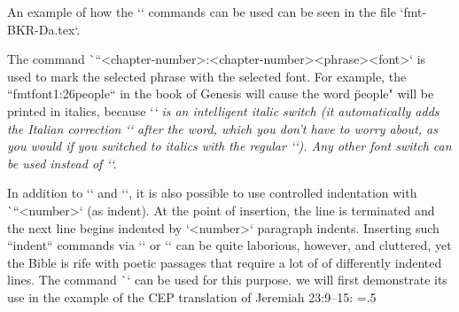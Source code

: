 An example of how the `\fmt*` commands can be used can be seen in the file
`fmt-BKR-Da.tex`.

The command \`\fmtfont``{<chapter-number>:<chapter-number>}{<phrase>}{<font>}`
is used to mark the selected phrase with the selected font.
For example, the ``fmtfont{1:26}{people}{\em}`` in the book of Genesis will cause the word
\"people" will be printed in italics, because `\em` is an intelligent italic switch (it automatically adds the Italian correction `\/` after the word, which you don't have to worry about, as you would if you switched to italics with the regular `\it`).
Any other font switch can be used instead of `\em`.

In addition to `\begcenter` and `\endcenter`, it is also possible to use controlled indentation with
\`\ind``<number>` (as indent). At the point of insertion, the line is terminated and the next line begins
indented by `<number>` paragraph indents. Inserting such ``indent`` commands
via `\fmtins` or `\fmtpre` can be quite laborious, however, and
cluttered, yet the Bible is rife with poetic passages that require a lot of
of differently indented lines. The command \`\fmtpoetry` can be used for this purpose.
we will first demonstrate its use in the example of the CEP translation of Jeremiah 23:9--15:
\medskip
\picw=.5\hsize
\centerline{ }
\vskip-2pt %
\centerline{ }
\picw=0pt

